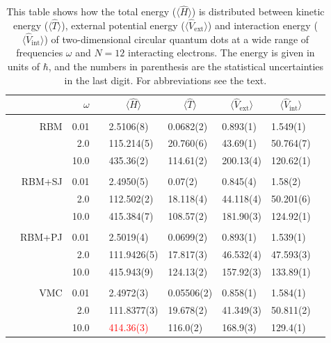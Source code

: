 \begin{table}
	\caption{This table shows how the total energy ($\langle\hat{H}\rangle$) is distributed between kinetic energy ($\langle\hat{T}\rangle$), external potential energy ($\langle\hat{V}_{\text{ext}}\rangle$) and interaction energy ($\langle\hat{V}_{\text{int}}\rangle$) of two-dimensional circular quantum dots at a wide range of frequencies $\omega$ and $N=12$ interacting electrons. The energy is given in units of $\hbar$, and the numbers in parenthesis are the statistical uncertainties in the last digit. For abbreviations see the text.}
	\label{tab:splitfrequencyQD12P}
	\begin{tabularx}{\textwidth}{R{0.5cm}rrcR{2.3cm}R{2.3cm}R{2.3cm}R{2.3cm}R{0.3cm}} \hline\hline
		&\makecell{\\ \phantom{$N$} \\ \phantom{=}} & $\omega$ &&  &  &  &  \\ \hline \\
		&RBM & 0.01 && 2.5106(8) & 0.0682(2) & 0.893(1) & 1.549(1) \\
		&& 2.0 && 115.214(5) & 20.760(6) & 43.69(1) & 50.764(7) \\
		&& 10.0 && 435.36(2) & 114.61(2) & 200.13(4) & 120.62(1) \\
		\hline \\
		
		&RBM+SJ & 0.01 && 2.4950(5) & 0.07(2) & 0.845(4) & 1.58(2) \\
		&& 2.0 && 112.502(2) & 18.118(4) & 44.118(4) & 50.201(6) \\
		&& 10.0 && 415.384(7) & 108.57(2) & 181.90(3) & 124.92(1) \\
		\hline \\
		
		&RBM+PJ & 0.01 && 2.5019(4) & 0.0699(2) & 0.893(1) & 1.539(1) \\
		&& 2.0 && 111.9426(5) & 17.817(3) & 46.532(4) & 47.593(3) \\
		&& 10.0 && 415.943(9) & 124.13(2) & 157.92(3) & 133.89(1) \\ 
		\hline \\
		
		&VMC & 0.01 && 2.4972(3) & 0.05506(2) & 0.858(1) & 1.584(1)\\
		&& 2.0 && 111.8377(3) & 19.678(2) & 41.349(3) & 50.811(2) \\
		&& 10.0 && \textcolor{red}{414.36(3)} & 116.0(2) & 168.9(3) & 129.4(1) \\
		\hline\hline
	\end{tabularx}
\end{table}
\fi

